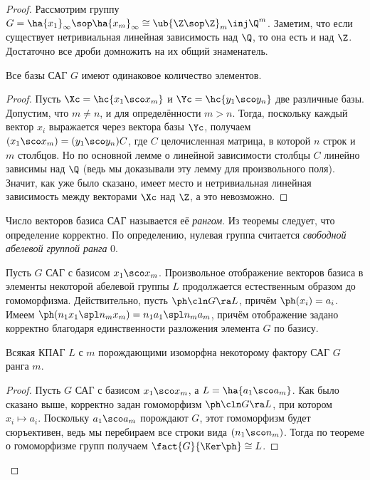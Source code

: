 \documentclass[a4paper]{article}
\newcommand{\kph}{\Ker \ph}
\begin{document}
\begin{proof}
Рассмотрим группу $G=\ha{x_1}_\infty\sop \ha{x_m}_\infty \cong \ub{\Z\sop\Z}_{m} \inj \Q^m$. Заметим, что
если существует нетривиальная линейная зависимость над $\Q$,  то она есть и над $\Z$. Достаточно все дроби
домножить на их общий знаменатель.

\begin{theorem}
Все базы САГ $G$ имеют одинаковое количество элементов.
\end{theorem}
\begin{proof}
Пусть $\Xc=\hc{x_1\sco x_m}$ и $\Yc=\hc{y_1\sco y_n}$ две различные базы.  Допустим, что $m \neq n$, и для
определённости $m > n$. Тогда, поскольку каждый вектор $x_i$ выражается через вектора базы $\Yc$, получаем
$(x_1\sco x_m)=(y_1\sco y_n)C$, где $C$ целочисленная матрица, в которой $n$ строк и $m$ столбцов. Но по
основной лемме о линейной зависимости столбцы $C$ линейно зависимы над $\Q$ (ведь мы доказывали эту лемму для
произвольного поля). Значит, как уже было сказано, имеет место и нетривиальная линейная зависимость между
векторами $\Xc$ над $\Z$, а это невозможно.
\end{proof}

\begin{df}
Число векторов базиса САГ называется её \emph{рангом}. Из теоремы следует,  что определение корректно. По
определению, нулевая группа считается \emph{свободной абелевой группой ранга} 0.
\end{df}

Пусть $G$ САГ с базисом $x_1\sco x_m$. Произвольное отображение векторов  базиса в элементы некоторой
абелевой группы $L$ продолжается естественным образом до гомоморфизма. Действительно, пусть $\ph\cln G \ra L$,
причём $\ph(x_i)=a_i$. Имеем $\ph(n_1x_1 \spl n_mx_m)= n_1a_1 \spl n_ma_m$, причём отображение задано
корректно благодаря единственности разложения элемента $G$ по базису.

\begin{theorem}
Всякая КПАГ $L$ с $m$ порождающими изоморфна некоторому фактору САГ $G$ ранга $m$.
\end{theorem}
\begin{proof}
Пусть $G$ САГ с базисом $x_1\sco x_m$, а $L=\ha{a_1\sco a_m}$. Как было  сказано выше, корректно задан
гомоморфизм $\ph\cln G \ra L$, при котором $x_i \mapsto a_i$. Поскольку $a_1\sco a_m$ порождают $G$, этот
гомоморфизм будет сюръективен, ведь мы перебираем все строки вида $(n_1\sco n_m)$. Тогда по теореме о
гомоморфизме групп получаем $\fact{G}{\kph} \cong L$.
\end{proof}


\end{proof}
\end{document}
